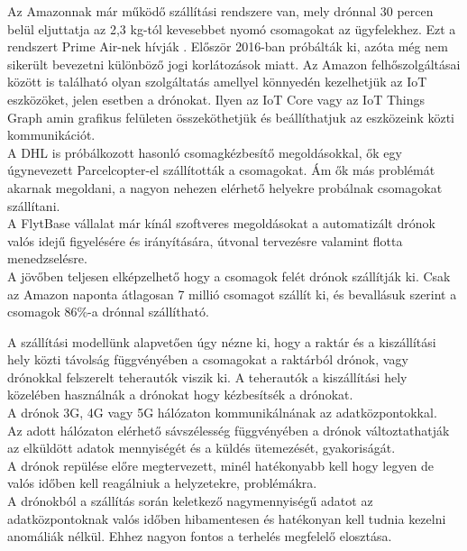 

Az Amazonnak már működő szállítási rendszere van, mely drónnal 30 percen belül eljuttatja az 2,3 kg-tól kevesebbet nyomó csomagokat az ügyfelekhez.
Ezt a rendszert Prime Air-nek hívják \cite{prime-air}.
Először 2016-ban próbálták ki, azóta még nem sikerült bevezetni különböző jogi korlátozások miatt.
Az Amazon felhőszolgáltásai között is található olyan szolgáltatás amellyel könnyedén kezelhetjük az IoT eszközöket, jelen esetben a drónokat.
Ilyen az IoT Core vagy az IoT Things Graph amin grafikus felületen összeköthetjük és beállíthatjuk az eszközeink közti kommunikációt. \\
A DHL is próbálkozott hasonló csomagkézbesítő megoldásokkal, ők egy úgynevezett Parcelcopter-el szállították a csomagokat.
Ám ők más problémát akarnak megoldani, a nagyon nehezen elérhető helyekre probálnak csomagokat szállítani.\\
A FlytBase \cite{flyt} vállalat már kínál szoftveres megoldásokat a automatizált drónok valós idejű figyelésére és irányítására, útvonal tervezésre valamint flotta menedzselésre.\\
A jövőben teljesen elképzelhető hogy a csomagok felét drónok szállítják ki. Csak az Amazon naponta átlagosan 7 millió csomagot szállít ki,
és bevallásuk szerint a csomagok 86\%-a drónnal szállítható.


A szállítási modellünk alapvetően úgy nézne ki, hogy a raktár és a kiszállítási hely közti távolság függvényében a csomagokat a raktárból drónok, vagy drónokkal felszerelt teherautók viszik ki.
A teherautók a kiszállítási hely közelében használnák a drónokat hogy kézbesítsék a drónokat.\\
A drónok 3G, 4G vagy 5G hálózaton kommunikálnának az adatközpontokkal.\\
Az adott hálózaton elérhető sávszélesség függvényében a drónok változtathatják az elküldött adatok mennyiségét és a küldés ütemezését, gyakoriságát.\\
A drónok repülése előre megtervezett, minél hatékonyabb kell hogy legyen de valós időben kell reagálniuk a helyzetekre, problémákra.\\
A drónokból a szállítás során keletkező nagymennyiségű adatot az adatközpontoknak valós időben hibamentesen
és hatékonyan kell tudnia kezelni anomáliák nélkül. Ehhez nagyon fontos a terhelés megfelelő elosztása. \\

